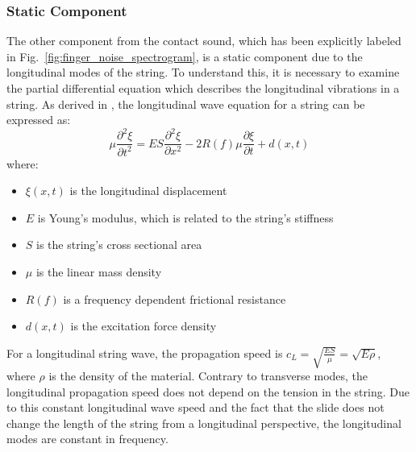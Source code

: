 \documentclass[main.tex]{subfiles}
\begin{document}
\subsubsection{Static Component}
The other component from the contact sound, which has been explicitly labeled in Fig.~\ref{fig:finger_noise_spectrogram}, is a static component due to the longitudinal modes of the string. To understand this, it is necessary to examine the partial differential equation which describes the longitudinal vibrations in a string. As derived in , the longitudinal wave equation for a string can be expressed as:
\begin{equation}
    \mu \frac{\partial^2 \xi}{\partial t^2} = ES\frac{\partial^2 \xi}{\partial x^2} - 2R(f)\mu \frac{\partial \xi}{\partial t} + d(x,t)
    \label{eqn:longitudinal_PDE}
\end{equation}
where:
\begin{itemize}
    \item $\xi(x,t)$ is the longitudinal displacement
    \item $E$ is Young's modulus, which is related to the string's stiffness
    \item $S$ is the string's cross sectional area
    \item $\mu$ is the linear mass density
    \item $R(f)$ is a frequency dependent frictional resistance
    \item $d(x,t)$ is the excitation force density
\end{itemize}

For a longitudinal string wave, the propagation speed is $c_L = \sqrt{\frac{ES}{\mu}} = \sqrt{E \rho}$, where $\rho$ is the density of the material. Contrary to transverse modes, the longitudinal propagation speed does not depend on the tension in the string. Due to this constant longitudinal wave speed and the fact that the slide does not change the length of the string from a longitudinal perspective, the longitudinal modes are constant in frequency.
\end{document}
